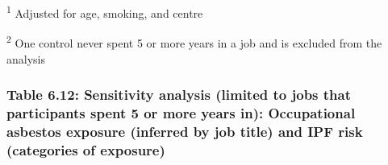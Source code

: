 \textsuperscript{1} Adjusted for age, smoking, and centre

\textsuperscript{2} One control never spent 5 or more years in a job and
is excluded from the analysis

\newpage

\hypertarget{table-6.12-sensitivity-analysis-limited-to-jobs-that-participants-spent-5-or-more-years-in-occupational-asbestos-exposure-inferred-by-job-title-and-ipf-risk-categories-of-exposure}{%
\subsubsection{Table 6.12: Sensitivity analysis (limited to jobs that
participants spent 5 or more years in): Occupational asbestos exposure
(inferred by job title) and IPF risk (categories of
exposure)}\label{table-6.12-sensitivity-analysis-limited-to-jobs-that-participants-spent-5-or-more-years-in-occupational-asbestos-exposure-inferred-by-job-title-and-ipf-risk-categories-of-exposure}}

